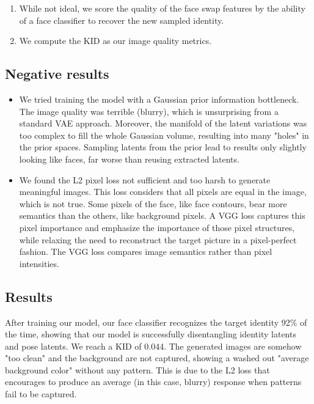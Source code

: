 \begin{enumerate}
    \item While not ideal, we score the quality of the face swap features by the ability of a face classifier to recover the new sampled identity.
    \item We compute the \ac{KID} \citep{kid} as our image quality metrics.
\end{enumerate}



\subsection{Negative results}

\begin{itemize}
    \item We tried training the model with a Gaussian prior information bottleneck. The image quality was terrible (blurry), which is unsurprising from a standard \ac{VAE} approach. Moreover, the manifold of the latent variations was too complex to fill the whole Gaussian volume, resulting into many "holes" in the prior spaces. Sampling latents from the prior lead to results only slightly looking like faces, far worse than reusing extracted latents.
    
    \item We found the L2 pixel loss not sufficient and too harsh to generate meaningful images. This loss considers that all pixels are equal in the image, which is not true. Some pixels of the face, like face contours, bear more semantics than the others, like background pixels. A VGG loss captures this pixel importance and emphasize the importance of those pixel structures, while relaxing the need to reconstruct the target picture in a pixel-perfect fashion. The VGG loss compares image semantics rather than pixel intensities.
\end{itemize}

\subsection{Results}

After training our model, our face classifier recognizes the target identity 92\% of the time, showing that our model is successfully disentangling identity latents and pose latents. We reach a KID of 0.044. The generated images are somehow "too clean" and the background are not captured, showing a washed out "average background color" without any pattern. This is due to the L2 loss that encourages to produce an average (in this case, blurry) response when patterns fail to be captured. 

